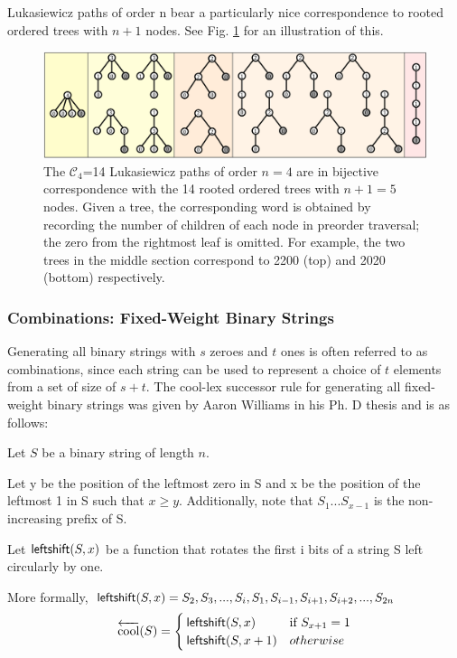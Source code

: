 Lukasiewicz paths  of order n bear a particularly nice correspondence to rooted ordered trees with $n+1$ nodes. See Fig. \ref{trees} for an illustration of this.

\begin{figure}[]
	\centering
	\includegraphics[width = .95 \textwidth]{trees.png}
	\caption{The $\mathcal{C}_4$=14 Lukasiewicz paths of order $n=4$ are in bijective correspondence with the 14 rooted ordered trees with $n+1=5$ nodes.  Given a tree, the corresponding word is obtained by recording the number of children of each node in preorder traversal; the zero from the rightmost leaf is omitted.  For example, the two trees in the middle section correspond to 2200 (top) and 2020 (bottom) respectively.}
	\label{trees}
\end{figure}

\subsubsection{Combinations: Fixed-Weight Binary Strings}
Generating all binary strings with $s$ zeroes and $t$ ones is often referred to as combinations, since each string can be used to represent a choice of $t$ elements from a set of size of $s+t$.  The cool-lex successor rule for generating all fixed-weight binary strings was given by Aaron Williams in his Ph. D thesis and is as follows\cite{williams2009shift}:

\noindent Let $S$ be a binary string of length $n$.

\noindent Let y be the position of the leftmost zero in S and x be the position of the leftmost 1 in S such that $x \ge y$.  Additionally, note that $S_1...S_{x-1}$ is the non-increasing prefix of S.

Let $\mathsf{leftshift(} S, x \mathsf{)}$ be a function that rotates the first i bits of a string S left circularly by one.

More formally, 
\noindent $\mathsf{leftshift(} S, x \mathsf{)}=S_2,S_3,...,S_i,S_1,S_{i-1},S_{i+1},S_{i+2},...,S_{2n}$
\begin{equation*}
    \overleftarrow{\text{cool}}(S) = \begin{cases}
	\mathsf{leftshift(} S, x \mathsf{)} & \text{if $S_{x+1}=1$}\\
	\mathsf{leftshift(} S, x+1 \mathsf{)} & otherwise\\
\end{cases}
\end{equation*}

